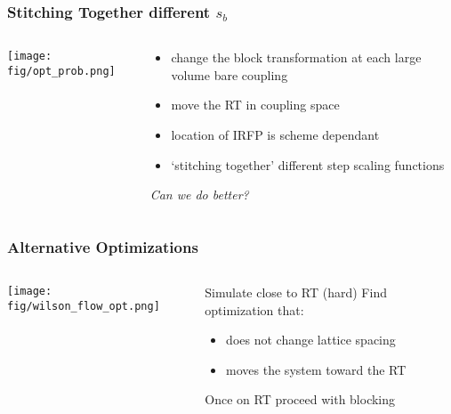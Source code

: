   \begin{frame}
    \frametitle{Stitching Together different $s_b$}
    \begin{columns}[T]
      \begin{column}{.5\textwidth}
        \begin{block}{}
          \texttt{[image: fig/opt\_prob.png]}
        \end{block}
      \end{column}
      \begin{column}{.5\textwidth}
        \begin{block}{}
          \begin{itemize}
            \item change the block transformation at each large volume bare coupling
            \item move the RT in coupling space
            \item location of IRFP is scheme dependant
            \item `stitching together' different step scaling functions
          \end{itemize}
        \end{block}
        \begin{center}\emph{Can we do better?}\end{center}
      \end{column}
    \end{columns}
  \end{frame}

  \begin{frame}
    \frametitle{Alternative Optimizations}
    \begin{columns}[T]
      \begin{column}{.4\textwidth}
        \begin{block}{}
          \texttt{[image: fig/wilson\_flow\_opt.png]}
        \end{block}
      \end{column}
      \begin{column}{.6\textwidth}
        \begin{block}{}
          Simulate close to RT (hard)\newline
          Find optimization that:
          \begin{itemize}
            \item does not change lattice spacing
            \item moves the system toward the RT
          \end{itemize}
          Once on RT proceed with blocking
        \end{block}
      \end{column}
    \end{columns}
  \end{frame}
